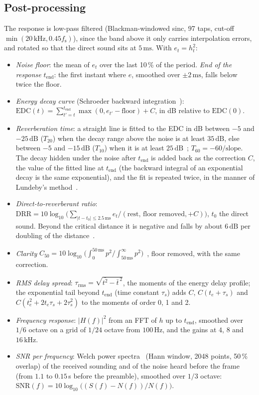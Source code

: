 \documentclass[11pt,a4paper]{article}
\newcommand{\kHz}{\,\mathrm{kHz}}
\newcommand{\Hz}{\,\mathrm{Hz}}
\newcommand{\ms}{\,\mathrm{ms}}
\newcommand{\dB}{\,\mathrm{dB}}
\newcommand{\fs}{f_{\mathrm{s}}}
\theoremstyle{remark}
\begin{document}
\subsection{Post-processing}
The response is low-pass filtered (Blackman-windowed sinc, 97 taps, cut-off $\min(20\kHz, 0.45\fs)$), since the band above it only carries interpolation errors, and rotated so that the direct sound sits at $5\ms$. With $e_t = h_t^2$:
\begin{itemize}
\item \emph{Noise floor}: the mean of $e_t$ over the last 10\,\% of the period. \emph{End of the response} $t_{\text{end}}$: the first instant where $e$, smoothed over $\pm 2\ms$, falls below twice the floor.
\item \emph{Energy decay curve} (Schroeder backward integration~\cite{schroeder65}): $\mathrm{EDC}(t) = \sum_{t' = t}^{t_{\text{end}}} \max(0, e_{t'} - \text{floor}) + C$, in dB relative to $\mathrm{EDC}(0)$.
\item \emph{Reverberation time}: a straight line is fitted to the EDC in dB between $-5$ and $-25\dB$ ($T_{20}$) when the decay range above the noise is at least $35\dB$, else between $-5$ and $-15\dB$ ($T_{10}$) when it is at least $25\dB$~\cite{iso3382}; $T_{60} = -60/\text{slope}$. The decay hidden under the noise after $t_{\text{end}}$ is added back as the correction $C$, the value of the fitted line at $t_{\text{end}}$ (the backward integral of an exponential decay is the same exponential), and the fit is repeated twice, in the manner of Lundeby's method~\cite{lundeby}.
\item \emph{Direct-to-reverberant ratio}: $\mathrm{DRR} = 10\log_{10}\bigl(\sum_{|t - t_0| \le 2.5\ms} e_t \big/ (\text{rest, floor removed}, + C)\bigr)$, $t_0$ the direct sound. Beyond the critical distance it is negative and falls by about $6\dB$ per doubling of the distance~\cite{kuttruff}.
\item \emph{Clarity} $C_{50} = 10\log_{10}\bigl(\int_0^{50\ms} p^2 \big/ \int_{50\ms}^\infty p^2\bigr)$~\cite{iso3382}, floor removed, with the same correction.
\item \emph{RMS delay spread}: $\tau_{\mathrm{rms}} = \sqrt{\bar{t^2} - \bar t^{\,2}}$, the moments of the energy delay profile; the exponential tail beyond $t_{\text{end}}$ (time constant $\tau_s$) adds $C$, $C(t_e + \tau_s)$ and $C(t_e^2 + 2t_e\tau_s + 2\tau_s^2)$ to the moments of order 0, 1 and 2.
\item \emph{Frequency response}: $|H(f)|^2$ from an FFT of $h$ up to $t_{\text{end}}$, smoothed over $1/6$ octave on a grid of $1/24$ octave from $100\Hz$, and the gains at $4$, $8$ and $16\kHz$.
\item \emph{SNR per frequency}: Welch power spectra~\cite{welch} (Hann window, 2048 points, 50\,\% overlap) of the received sounding and of the noise heard before the frame (from $1.1$ to $0.15$\,s before the preamble), smoothed over $1/3$ octave: $\mathrm{SNR}(f) = 10\log_{10}\bigl((S(f) - N(f))/N(f)\bigr)$.
\end{itemize}
\end{document}
